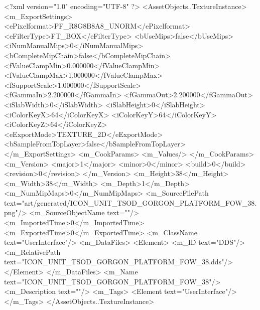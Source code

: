 <?xml version="1.0" encoding="UTF-8" ?>
<AssetObjects..TextureInstance>
	<m_ExportSettings>
		<ePixelformat>PF_R8G8B8A8_UNORM</ePixelformat>
		<eFilterType>FT_BOX</eFilterType>
		<bUseMips>false</bUseMips>
		<iNumManualMips>0</iNumManualMips>
		<bCompleteMipChain>false</bCompleteMipChain>
		<fValueClampMin>0.000000</fValueClampMin>
		<fValueClampMax>1.000000</fValueClampMax>
		<fSupportScale>1.000000</fSupportScale>
		<fGammaIn>2.200000</fGammaIn>
		<fGammaOut>2.200000</fGammaOut>
		<iSlabWidth>0</iSlabWidth>
		<iSlabHeight>0</iSlabHeight>
		<iColorKeyX>64</iColorKeyX>
		<iColorKeyY>64</iColorKeyY>
		<iColorKeyZ>64</iColorKeyZ>
		<eExportMode>TEXTURE_2D</eExportMode>
		<bSampleFromTopLayer>false</bSampleFromTopLayer>
	</m_ExportSettings>
	<m_CookParams>
		<m_Values/>
	</m_CookParams>
	<m_Version>
		<major>1</major>
		<minor>0</minor>
		<build>0</build>
		<revision>0</revision>
	</m_Version>
	<m_Height>38</m_Height>
	<m_Width>38</m_Width>
	<m_Depth>1</m_Depth>
	<m_NumMipMaps>0</m_NumMipMaps>
	<m_SourceFilePath text="art/generated/ICON_UNIT_TSOD_GORGON_PLATFORM_FOW_38.png"/>
	<m_SourceObjectName text=""/>
	<m_ImportedTime>0</m_ImportedTime>
	<m_ExportedTime>0</m_ExportedTime>
	<m_ClassName text="UserInterface"/>
	<m_DataFiles>
		<Element>
			<m_ID text="DDS"/>
			<m_RelativePath text="ICON_UNIT_TSOD_GORGON_PLATFORM_FOW_38.dds"/>
		</Element>
	</m_DataFiles>
	<m_Name text="ICON_UNIT_TSOD_GORGON_PLATFORM_FOW_38"/>
	<m_Description text=""/>
	<m_Tags>
		<Element text="UserInterface"/>
	</m_Tags>
</AssetObjects..TextureInstance>
